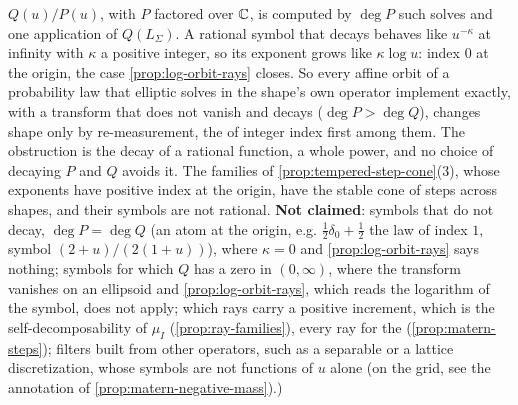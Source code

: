 \begin{proposition}
{$Q(u)/P(u)$, with $P$ factored over $\mathbb{C}$, is computed by $\operatorname{deg}P$ such solves and one application of
$Q(L_\Sigma)$. A rational symbol that decays behaves like $u^{-\kappa}$ at infinity with $\kappa$ a
positive integer, so its exponent grows like $\kappa\log u$: index $0$ at the origin, the case
\ref{prop:log-orbit-rays} closes. So every affine orbit of a probability law that elliptic solves
in the shape's own operator implement exactly, with a transform that does not vanish and decays
($\operatorname{deg}P > \operatorname{deg}Q$), changes shape only by re-measurement, the \Matern{} of
integer index first among them. The obstruction is the decay of a rational function, a whole
power, and no choice of decaying $P$ and $Q$ avoids it. The
families of \ref{prop:tempered-step-cone}(3), whose exponents have positive index at the origin,
have the stable cone of steps across shapes, and their symbols are not rational. \textbf{Not
claimed}: symbols that do not decay, $\operatorname{deg}P = \operatorname{deg}Q$ (an atom at the origin,
e.g. $\tfrac12\delta_0 + \tfrac12$ the \Matern{} law of index $1$, symbol $(2 + u)/(2(1 + u))$), where
$\kappa = 0$ and \ref{prop:log-orbit-rays} says nothing; symbols for which $Q$ has a zero in $(0,\infty)$, where the
transform vanishes on an ellipsoid and \ref{prop:log-orbit-rays}, which reads the logarithm of the
symbol, does not apply; which rays carry a positive increment, which is the self-decomposability of
$\mu_I$ (\ref{prop:ray-families}), every ray for the \Matern{} (\ref{prop:matern-steps}); filters
built from other operators, such as a separable or a lattice discretization, whose symbols are not
functions of $u$ alone (on the grid, see the annotation of \ref{prop:matern-negative-mass}).)}
\end{proposition}

